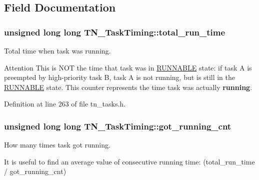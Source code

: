 \subsection{Field Documentation}
\hypertarget{structTN__TaskTiming_a97964cfe380308698fffd730964f4d5c}{
\subsubsection[{total\+\_\+run\+\_\+time}]{\setlength{\rightskip}{0pt plus 5cm}unsigned long long T\+N\+\_\+\+Task\+Timing\+::total\+\_\+run\+\_\+time}}\label{structTN__TaskTiming_a97964cfe380308698fffd730964f4d5c}


Total time when task was running. 

\begin{DoxyAttention}{Attention}
This is N\+O\+T the time that task was in \hyperlink{tn__tasks_8h_a5e12e8a0ab280b515f44bf3fee1210a6a02783ac7808aeda318a6f506b7a276dc}{{\ttfamily R\+U\+N\+N\+A\+B\+L\+E}} state\+: if task A is preempted by high-\/priority task B, task A is not running, but is still in the \hyperlink{tn__tasks_8h_a5e12e8a0ab280b515f44bf3fee1210a6a02783ac7808aeda318a6f506b7a276dc}{{\ttfamily R\+U\+N\+N\+A\+B\+L\+E}} state. This counter represents the time task was actually {\bfseries running}. 
\end{DoxyAttention}


Definition at line 263 of file tn\+\_\+tasks.\+h.

\hypertarget{structTN__TaskTiming_ad158c48fe2c596d914cab40c9a7838ae}{
\subsubsection[{got\+\_\+running\+\_\+cnt}]{\setlength{\rightskip}{0pt plus 5cm}unsigned long long T\+N\+\_\+\+Task\+Timing\+::got\+\_\+running\+\_\+cnt}}\label{structTN__TaskTiming_ad158c48fe2c596d914cab40c9a7838ae}


How many times task got running. 

It is useful to find an average value of consecutive running time\+: {\ttfamily (total\+\_\+run\+\_\+time / got\+\_\+running\+\_\+cnt)} 

